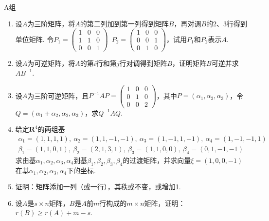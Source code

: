 \centerline{\heiti A组}
\begin{enumerate}
    \item 设$A$为三阶矩阵，将$A$的第二列加到第一列得到矩阵$B$，再对调$B$的2、3行得到单位矩阵. 令$P_1=\begin{pmatrix}1 & 0 & 0 \\ 1 & 1 & 0 \\ 0 & 0 & 1\end{pmatrix}\enspace
    P_2=\begin{pmatrix}1 & 0 & 0 \\ 0 & 0 & 1 \\ 0 & 1 & 0\end{pmatrix}$，试用$P_1$和$P_2$表示$A$.

    \item 设$A$为可逆矩阵，将$A$的第$i$行和第$j$行对调得到矩阵$B$，证明矩阵$B$可逆并求$AB^{-1}$.

    \item 设$A$为三阶可逆矩阵，且$P^{-1}AP=\begin{pmatrix}1 & 0 & 0 \\ 0 & 1 & 0 \\ 0 & 0 & 2\end{pmatrix}$，其中$P=(\alpha_1,\alpha_2,\alpha_3)$，令$Q=(\alpha_1+\alpha_2,\alpha_2,\alpha_3)$，求$Q^{-1}AQ$.

    \item 给定$\mathbf{R}^4$的两组基
          \begin{gather*}
              \alpha_1=(1,1,1,1),\ \alpha_2=(1,1,-1,-1),\ \alpha_3=(1,-1,1,-1),\ \alpha_4=(1,-1,-1,1) \\
              \beta_1=(1,1,0,1),\ \beta_2=(2,1,3,1),\ \beta_3=(1,1,0,0),\ \beta_4=(0,1,-1,-1)
          \end{gather*}
          求由基$\alpha_1,\alpha_2,\alpha_3,\alpha_4$到基$\beta_1,\beta_2,\beta_3,\beta_4$的过渡矩阵，并求向量$\xi=(1,0,0,-1)$在基$\alpha_1,\alpha_2,\alpha_3,\alpha_4$下的坐标.

    \item 证明：矩阵添加一列（或一行），其秩或不变，或增加1.

    \item 设$A$是$s \times n$矩阵，$B$是$A$前$m$行构成的$m \times n$矩阵，证明：$r(B) \geqslant r(A) + m - s$.
\end{enumerate}

